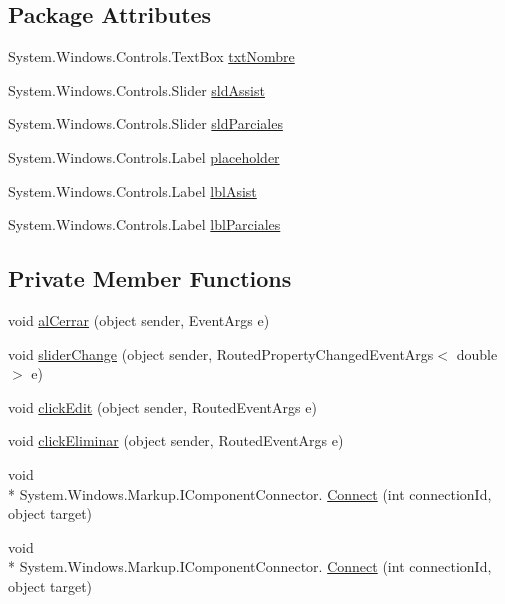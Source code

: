 \subsection*{Package Attributes}
\begin{DoxyCompactItemize}
\item 
System.\-Windows.\-Controls.\-Text\-Box \hyperlink{class_asistencias__wpf_1_1_modificar_club_aefec4cf6adde6b83050acc590661f212}{txt\-Nombre}
\item 
System.\-Windows.\-Controls.\-Slider \hyperlink{class_asistencias__wpf_1_1_modificar_club_a10b87622ef3fad840bb25827b45b6fc6}{sld\-Assist}
\item 
System.\-Windows.\-Controls.\-Slider \hyperlink{class_asistencias__wpf_1_1_modificar_club_a8333d2f10cd950124c2de671a73fd288}{sld\-Parciales}
\item 
System.\-Windows.\-Controls.\-Label \hyperlink{class_asistencias__wpf_1_1_modificar_club_a2b2c3976252b8870397a47d96673c856}{placeholder}
\item 
System.\-Windows.\-Controls.\-Label \hyperlink{class_asistencias__wpf_1_1_modificar_club_ac5bdd9fd539f35d3f2e5fbd928913db5}{lbl\-Asist}
\item 
System.\-Windows.\-Controls.\-Label \hyperlink{class_asistencias__wpf_1_1_modificar_club_a898ac5359d41d715dbfb86b46a84a39f}{lbl\-Parciales}
\end{DoxyCompactItemize}
\subsection*{Private Member Functions}
\begin{DoxyCompactItemize}
\item 
void \hyperlink{class_asistencias__wpf_1_1_modificar_club_a62e46dfa2c839600b567b62bd582dca2}{al\-Cerrar} (object sender, Event\-Args e)
\item 
void \hyperlink{class_asistencias__wpf_1_1_modificar_club_a16e4ed6700460777f30a494ee9eb0680}{slider\-Change} (object sender, Routed\-Property\-Changed\-Event\-Args$<$ double $>$ e)
\item 
void \hyperlink{class_asistencias__wpf_1_1_modificar_club_a6dfe0e9c1334d6b3b0a885ff2138119a}{click\-Edit} (object sender, Routed\-Event\-Args e)
\item 
void \hyperlink{class_asistencias__wpf_1_1_modificar_club_ac2e5f560752b2b1a6dc4e75cfecc5c04}{click\-Eliminar} (object sender, Routed\-Event\-Args e)
\item 
void \\*
System.\-Windows.\-Markup.\-I\-Component\-Connector. \hyperlink{class_asistencias__wpf_1_1_modificar_club_aad81df21e8ab11bf3c3f588d9913076a}{Connect} (int connection\-Id, object target)
\item 
void \\*
System.\-Windows.\-Markup.\-I\-Component\-Connector. \hyperlink{class_asistencias__wpf_1_1_modificar_club_aad81df21e8ab11bf3c3f588d9913076a}{Connect} (int connection\-Id, object target)
\end{DoxyCompactItemize}
